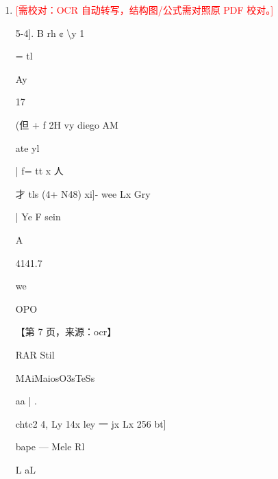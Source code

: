\documentclass[UTF8,12pt,a4paper,openany]{ctexbook}
\newcommand{\TODO}[1]{\textcolor{red}{[需校对：#1]}}
\begin{document}
\begin{enumerate}[label=\textbf{\arabic*.},leftmargin=2em]
\item \TODO{OCR 自动转写，结构图/公式需对照原 PDF 校对。}\par 5-4]. B          rh ¢          \textbackslash{}y       1\par =   tl\par Ay\par 17\par (但 + f  2H vy diego  AM\par ate      yl\par |           f= tt x   人\par 才 tls (4+ N48) xi]- wee Lx Gry\par |                     Ye F sein\par A\par 4141.7\par we\par OPO\par \par 【第 7 页，来源：ocr】\par RAR Stil\par MAiMaiosO3sTeSs\par aa |       .\par chtc2 4, Ly 14x ley 一 jx Lx 256 bt]\par bape — Mele Rl\par L                                        aL

\end{enumerate}
\end{document}
